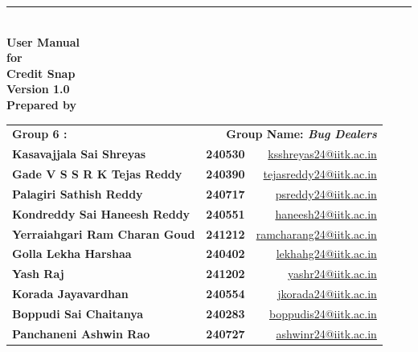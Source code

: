 \documentclass[a4paper,12pt]{article}
\begin{document}
\thispagestyle{empty}

\begin{flushright}
    \noindent\rule{\linewidth}{4pt}\\[0.9cm]
    {\Huge\bfseries User Manual}\\[1.1cm]
    {\LARGE\bfseries for}\\[1.2cm]
    {\Huge\bfseries Credit Snap}\\[1.2cm]
    {\Large\bfseries Version 1.0}\\[1.6cm]
    {\Large\bfseries Prepared by}
\end{flushright}

\vspace{1.2cm}

\noindent
\begin{tabular*}{\textwidth}{@{} l @{\extracolsep{\fill}} r @{\hspace{1.2cm}} r @{}}
\bfseries Group 6 : &
\multicolumn{2}{r}{\bfseries\Large Group Name: \textit{Bug Dealers}} \\[1em]
\textbf{Kasavajjala Sai Shreyas}        & \textbf{240530} & \href{mailto:ksshreyas24@iitk.ac.in}{ksshreyas24@iitk.ac.in} \\
\textbf{Gade V S S R K Tejas Reddy}     & \textbf{240390} & \href{mailto:tejasreddy24@iitk.ac.in}{tejasreddy24@iitk.ac.in} \\
\textbf{Palagiri Sathish Reddy}         & \textbf{240717} & \href{mailto:psreddy24@iitk.ac.in}{psreddy24@iitk.ac.in} \\
\textbf{Kondreddy Sai Haneesh Reddy}    & \textbf{240551} & \href{mailto:haneesh24@iitk.ac.in}{haneesh24@iitk.ac.in} \\
\textbf{Yerraiahgari Ram Charan Goud}   & \textbf{241212} & \href{mailto:ramcharang24@iitk.ac.in}{ramcharang24@iitk.ac.in} \\
\textbf{Golla Lekha Harshaa}            & \textbf{240402} & \href{mailto:lekhahg24@iitk.ac.in}{lekhahg24@iitk.ac.in} \\
\textbf{Yash Raj}                       & \textbf{241202} & \href{mailto:yashr24@iitk.ac.in}{yashr24@iitk.ac.in} \\
\textbf{Korada Jayavardhan}             & \textbf{240554} & \href{mailto:jkorada24@iitk.ac.in}{jkorada24@iitk.ac.in} \\
\textbf{Boppudi Sai Chaitanya}          & \textbf{240283} & \href{mailto:boppudis24@iitk.ac.in}{boppudis24@iitk.ac.in} \\
\textbf{Panchaneni Ashwin Rao}          & \textbf{240727} & \href{mailto:ashwinr24@iitk.ac.in}{ashwinr24@iitk.ac.in} \\
\end{tabular*}
\end{document}
